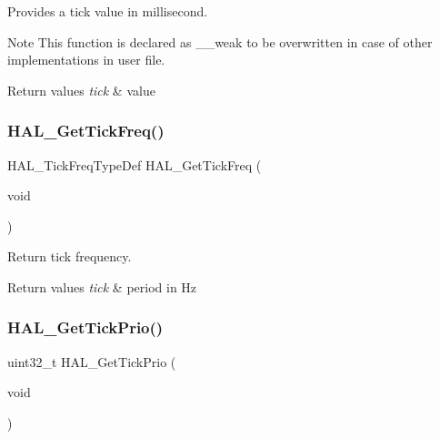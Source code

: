 Provides a tick value in millisecond. 

\begin{DoxyNote}{Note}
This function is declared as \+\_\+\+\_\+weak to be overwritten in case of other implementations in user file. 
\end{DoxyNote}

\begin{DoxyRetVals}{Return values}
{\em tick} & value \\
\hline
\end{DoxyRetVals}
\mbox{\label{group___h_a_l___exported___functions___group2_ga803cdbcc0883bcf5f5c98c50024c97e6}} 
\subsubsection{\texorpdfstring{H\+A\+L\+\_\+\+Get\+Tick\+Freq()}{HAL\_GetTickFreq()}}
{\footnotesize\ttfamily H\+A\+L\+\_\+\+Tick\+Freq\+Type\+Def H\+A\+L\+\_\+\+Get\+Tick\+Freq (\begin{DoxyParamCaption}\item[{void}]{ }\end{DoxyParamCaption})}



Return tick frequency. 


\begin{DoxyRetVals}{Return values}
{\em tick} & period in Hz \\
\hline
\end{DoxyRetVals}
\mbox{\label{group___h_a_l___exported___functions___group2_gacdcc8b5d33b9f97fe1b0abd6a86a3d4b}} 
\subsubsection{\texorpdfstring{H\+A\+L\+\_\+\+Get\+Tick\+Prio()}{HAL\_GetTickPrio()}}
{\footnotesize\ttfamily uint32\+\_\+t H\+A\+L\+\_\+\+Get\+Tick\+Prio (\begin{DoxyParamCaption}\item[{void}]{ }\end{DoxyParamCaption})}



